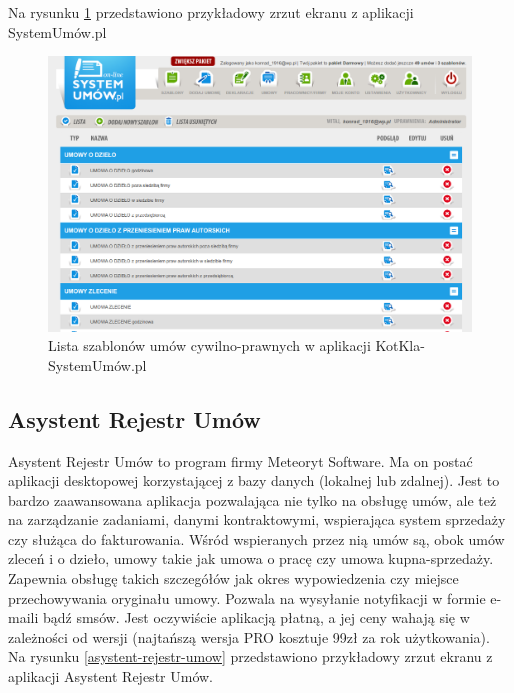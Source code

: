 Na rysunku \ref{kotkla-systemumow} przedstawiono przykładowy zrzut ekranu z aplikacji SystemUmów.pl

\begin{figure}[tdh]
    \begin{center}
	\includegraphics[scale=.4]{img/kotkla-systemumow.png}
	\caption{Lista szablonów umów cywilno-prawnych w aplikacji KotKla-SystemUmów.pl}
	\label{kotkla-systemumow}
    \end{center}
\end{figure}

\subsection[Asystent Rejestr Umów][Asystent Rejestr Umów]{Asystent Rejestr Umów}
Asystent Rejestr Umów to program firmy Meteoryt Software. Ma on postać aplikacji desktopowej korzystającej z bazy danych (lokalnej lub zdalnej). Jest to bardzo zaawansowana aplikacja pozwalająca nie tylko na obsługę umów, ale też na zarządzanie zadaniami, danymi kontraktowymi, wspierająca system sprzedaży czy służąca do fakturowania. Wśród wspieranych przez nią umów są, obok umów zleceń i o dzieło, umowy takie jak umowa o pracę czy umowa kupna-sprzedaży. Zapewnia obsługę takich szczegółów jak okres wypowiedzenia czy miejsce przechowywania oryginału umowy. Pozwala na wysyłanie notyfikacji w formie e-maili bądź smsów. Jest oczywiście aplikacją płatną, a jej ceny wahają się w zależności od wersji (najtańszą wersja PRO kosztuje 99zł za rok użytkowania). Na rysunku \ref{asystent-rejestr-umow} przedstawiono przykładowy zrzut ekranu z aplikacji Asystent Rejestr Umów.

